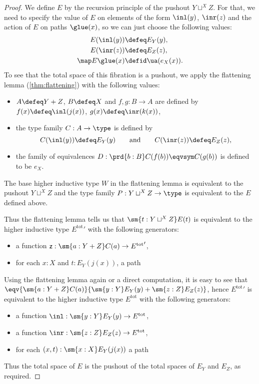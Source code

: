 \begin{proof}
  We define $E$ by the recursion principle of the pushout $Y\sqcup^XZ$. For
  that, we need to specify the value of $E$ on elements of the form $\inl(y)$, $\inr(z)$
  and the action of $E$ on paths $\glue(x)$, so we can just choose the following
  values:
  \begin{align*}
    E(\inl(y)) & \defeq E_Y(y),\\
    E(\inr(z)) & \defeq E_Z(z),\\
    \map E{\glue(x)} & \defid \ua(e_X(x)).
  \end{align*}
  To see that the total space of this fibration is a pushout, we apply the
  flattening lemma (\cref{thm:flattening}) with the following values:
  \begin{itemize}
  \item $A\defeq Y+Z$, $B\defeq X$ and $f,g:B\to A$ are defined by
    $f(x)\defeq\inl(j(x))$, $g(x)\defeq\inr(k(x))$,
  \item the type family $C:A\to\type$ is defined by
    \begin{equation*}
      C(\inl(y)) \defeq E_Y(y)
      \qquad\text{and}\qquad
      C(\inr(z)) \defeq E_Z(z),
    \end{equation*}
  \item the family of equivalences $D:\prd{b:B}C(f(b))\eqvsym C(g(b))$ is defined
    to be $e_X$.
  \end{itemize}
  The base higher inductive type $W$ in the flattening lemma is equivalent to
  the pushout $Y\sqcup^XZ$ and the type family $P:Y\sqcup^XZ\to\type$ is
  equivalent to the $E$ defined above.

  Thus the flattening lemma tells us that $\sm{t:Y\sqcup^XZ}E(t)$ is equivalent
  to the higher inductive type ${E^{\mathrm{tot}}}'$ with the following generators:
  \begin{itemize}
  \item a function $\mathsf{z}:\sm{a:Y+Z}C(a)\to {E^{\mathrm{tot}}}'$,
  \item for each $x:X$ and $t:E_Y(j(x))$, a path
  \end{itemize}
  Using the flattening lemma again or a direct computation, it is easy to see
  that $\eqv{\sm{a:Y+Z}C(a)}{\sm{y:Y}E_Y(y)+\sm{z:Z}E_Z(z)}$, hence
  ${E^{\mathrm{tot}}}'$ is equivalent to the higher inductive type
  $E^{\mathrm{tot}}$ with the following generators:
  \begin{itemize}
  \item a function $\inl:\sm{y:Y}E_Y(y)\to E^{\mathrm{tot}}$,
  \item a function $\inr:\sm{z:Z}E_Z(z)\to E^{\mathrm{tot}}$,
  \item for each $(x,t):\sm{x:X}E_Y(j(x))$ a path
  \end{itemize}
  Thus the total space of $E$ is the pushout of the total spaces of
  $E_Y$ and $E_Z$, as required.
\end{proof}

